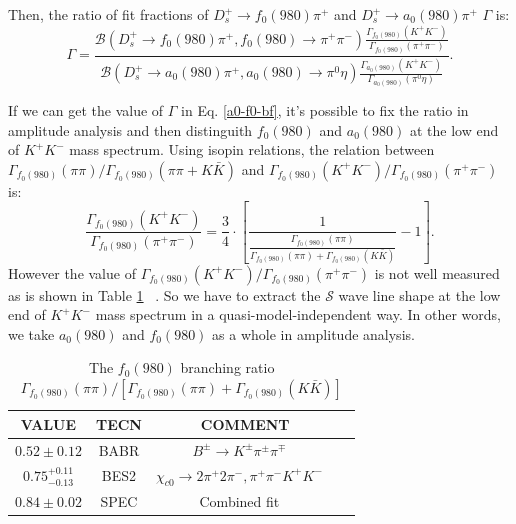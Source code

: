 {    Then, the ratio of fit fractions of $D_{s}^{+} \rightarrow f_{0}(980)\pi^{+}$ and $D_{s}^{+} \rightarrow a_{0}(980)\pi^{+}$ $\Gamma$ is: 
    \begin{equation}
            \Gamma  =\frac{\mathcal{B}(D_{s}^{+} \rightarrow f_{0}(980)\pi^{+}, f_{0}(980) \rightarrow \pi^{+}\pi^{-})  \frac{\Gamma_{f_{0}(980)}(K^{+}K^{-})}{ \Gamma_{f_{0}(980)}(\pi^{+}\pi^{-})}}{\mathcal{B}(D_{s}^{+} \rightarrow a_{0}(980)\pi^{+}, a_{0}(980) \rightarrow \pi^{0}\eta)  \frac{\Gamma_{a_{0}(980)}(K^{+}K^{-})}{ \Gamma_{a_{0}(980)}(\pi^{0}\eta)}}. \label{a0-f0-bf}
    \end{equation}
    
    If we can get the value of $\Gamma$ in Eq. \ref{a0-f0-bf}, it's possible to fix the ratio in amplitude analysis and then distinguith $f_{0}(980)$ and $a_{0}(980)$ at the low end of $K^{+}K^{-}$ mass spectrum.
    Using isopin relations,  the relation between $\Gamma_{f_{0}(980)}(\pi\pi) /  \Gamma_{f_{0}(980)}(\pi\pi+K\bar{K})$ and $\Gamma_{f_{0}(980)}(K^{+}K^{-}) / \Gamma_{f_{0}(980)}(\pi^{+}\pi^{-})$ is:
    \begin{equation}
        \frac{\Gamma_{f_{0}(980)}(K^{+}K^{-})}{ \Gamma_{f_{0}(980)}(\pi^{+}\pi^{-})} =  \frac{3}{4} \cdot \left[\frac{1}{\frac{\Gamma_{f_{0}(980)}(\pi\pi)} {\Gamma_{f_{0}(980)}(\pi\pi)+\Gamma_{f_{0}(980)}(K\bar{K})}} -1\right]. \label{f0-KK-pipi-relation}
    \end{equation}
    However the value of $\Gamma_{f_{0}(980)}(K^{+}K^{-}) / \Gamma_{f_{0}(980)}(\pi^{+}\pi^{-})$ is not well measured as is shown in Table \ref{f0-KK-pipi} ~\cite{PDG2018}.
    So we have to extract the $\mathcal{S}$ wave line shape at the low end of $K^{+}K^{-}$ mass spectrum in a quasi-model-independent way.
    In other words, we take $a_{0}(980)$ and $f_{0}(980)$ as a whole in amplitude analysis.

\begin{table}
    \caption{The $f_{0}(980)$ branching ratio $\Gamma_{f_{0}(980)}(\pi\pi) / \left[ \Gamma_{f_{0}(980)}(\pi\pi)+\Gamma_{f_{0}(980)}(K\bar{K})\right]$}
    \label{f0-KK-pipi}
    \begin{center}
        \begin{tabular}{cccc}
            \toprule
            VALUE &         TECN & COMMENT\\
            \hline
            $0.52\pm0.12$ &             BABR    & $B^{\pm} \rightarrow K^{\pm}\pi^{\pm}\pi^{\mp}$   ~\cite{pipi-KK-1} \\
            $0.75_{-0.13}^{+0.11}$ &    BES2    & $\chi_{c0} \rightarrow 2\pi^{+}2\pi^{-}, \pi^{+}\pi^{-}K^{+}K^{-}$   ~\cite{pipi-KK-2} \\
            $0.84\pm0.02$ &             SPEC    & Combined fit   ~\cite{pipi-KK-3} \\
            \bottomrule
        \end{tabular}
    \end{center}
\end{table}





}

